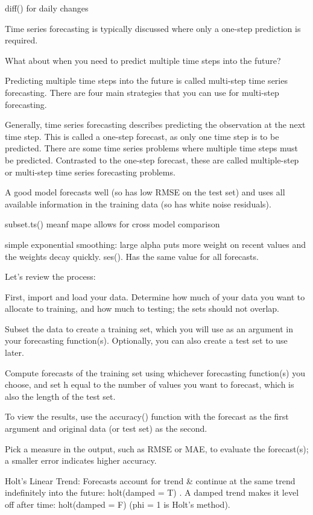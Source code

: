 \documentclass[]{book}
\begin{document}
diff() for daily changes

Time series forecasting is typically discussed where only a one-step
prediction is required.

What about when you need to predict multiple time steps into the future?

Predicting multiple time steps into the future is called multi-step time
series forecasting. There are four main strategies that you can use for
multi-step forecasting.

Generally, time series forecasting describes predicting the observation
at the next time step. This is called a one-step forecast, as only one
time step is to be predicted. There are some time series problems where
multiple time steps must be predicted. Contrasted to the one-step
forecast, these are called multiple-step or multi-step time series
forecasting problems.

A good model forecasts well (so has low RMSE on the test set) and uses
all available information in the training data (so has white noise
residuals).

subset.ts() \textbar{} meanf \textbar{} mape allows for cross model
comparison

simple exponential smoothing: large alpha puts more weight on recent
values and the weights decay quickly. ses(). Has the same value for all
forecasts.

Let's review the process:

First, import and load your data. Determine how much of your data you
want to allocate to training, and how much to testing; the sets should
not overlap.

Subset the data to create a training set, which you will use as an
argument in your forecasting function(s). Optionally, you can also
create a test set to use later.

Compute forecasts of the training set using whichever forecasting
function(s) you choose, and set h equal to the number of values you want
to forecast, which is also the length of the test set.

To view the results, use the accuracy() function with the forecast as
the first argument and original data (or test set) as the second.

Pick a measure in the output, such as RMSE or MAE, to evaluate the
forecast(s); a smaller error indicates higher accuracy.

Holt's Linear Trend: Forecasts account for trend \& continue at the same
trend indefinitely into the future: holt(damped = T) . A damped trend
makes it level off after time: holt(damped = F) (phi = 1 is Holt's
method).
\end{document}
